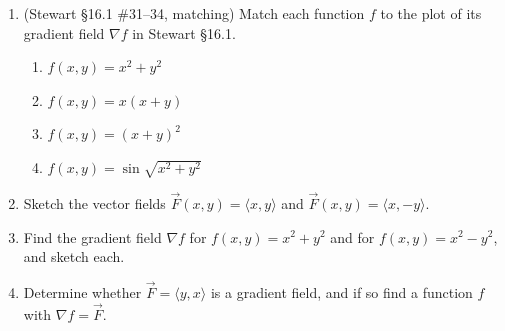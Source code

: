 \documentclass[12pt]{article}
\newcommand{\ihat}{\hat{\textbf{i}}}
\newcommand{\jhat}{\hat{\textbf{j}}}
\newcommand{\khat}{\hat{\textbf{k}}}
\begin{document}
\begin{enumerate}
\begin{enumerate}
        \begin{enumerate}
            \item $\vec F = \ihat + 2\jhat + 3\khat$
            \item $\vec F = \ihat + 2\jhat + z\,\khat$
            \item $\vec F = x\,\ihat + y\,\jhat + 3\khat$
            \item $\vec F = x\,\ihat + y\,\jhat + z\,\khat$
        \end{enumerate}
        \item (Stewart \S16.1 \#31--34, matching) Match each function $f$ to the plot of its gradient field $\nabla f$ in Stewart \S16.1.
        \begin{enumerate}
            \item $f(x,y) = x^2 + y^2$
            \item $f(x,y) = x(x+y)$
            \item $f(x,y) = (x+y)^2$
            \item $f(x,y) = \sin\sqrt{x^2+y^2}$
        \end{enumerate}
        \item Sketch the vector fields $\vec F(x,y)=\langle x,y\rangle$ and $\vec F(x,y)=\langle x,-y\rangle$.
        \item Find the gradient field $\nabla f$ for $f(x,y)=x^2+y^2$ and for $f(x,y)=x^2-y^2$, and sketch each.
        \item Determine whether $\vec F=\langle y,x\rangle$ is a gradient field, and if so find a function $f$ with $\nabla f=\vec F$.
    \end{enumerate}
\newpage


\end{enumerate}
\end{document}
